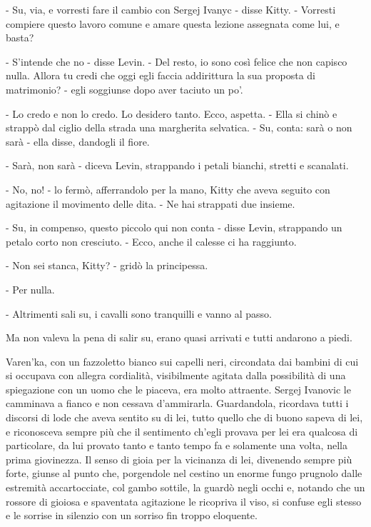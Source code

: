 - Su, via, e vorresti fare il cambio con Sergej Ivanyc - disse Kitty. - Vorresti compiere questo lavoro comune e amare questa lezione assegnata come lui, e basta? 

- S'intende che no - disse Levin. - Del resto, io sono così felice che non capisco nulla. Allora tu credi che oggi egli faccia addirittura la sua proposta di matrimonio? - egli soggiunse dopo aver taciuto un po'. 

- Lo credo e non lo credo. Lo desidero tanto. Ecco, aspetta. - Ella si chinò e strappò dal ciglio della strada una margherita selvatica. - Su, conta: sarà o non sarà - ella disse, dandogli il fiore. 

- Sarà, non sarà - diceva Levin, strappando i petali bianchi, stretti e scanalati. 

- No, no! - lo fermò, afferrandolo per la mano, Kitty che aveva seguito con agitazione il movimento delle dita. - Ne hai strappati due insieme. 

- Su, in compenso, questo piccolo qui non conta - disse Levin, strappando un petalo corto non cresciuto. - Ecco, anche il calesse ci ha raggiunto. 

- Non sei stanca, Kitty? - gridò la principessa. 

- Per nulla. 

- Altrimenti sali su, i cavalli sono tranquilli e vanno al passo. 

Ma non valeva la pena di salir su, erano quasi arrivati e tutti andarono a piedi. 

Varen'ka, con un fazzoletto bianco sui capelli neri, circondata dai bambini di cui si occupava con allegra cordialità, visibilmente agitata dalla possibilità di una spiegazione con un uomo che le piaceva, era molto attraente. Sergej Ivanovic le camminava a fianco e non cessava d'ammirarla. Guardandola, ricordava tutti i discorsi di lode che aveva sentito su di lei, tutto quello che di buono sapeva di lei, e riconosceva sempre più che il sentimento ch'egli provava per lei era qualcosa di particolare, da lui provato tanto e tanto tempo fa e solamente una volta, nella prima giovinezza. Il senso di gioia per la vicinanza di lei, divenendo sempre più forte, giunse al punto che, porgendole nel cestino un enorme fungo prugnolo dalle estremità accartocciate, col gambo sottile, la guardò negli occhi e, notando che un rossore di gioiosa e spaventata agitazione le ricopriva il viso, si confuse egli stesso e le sorrise in silenzio con un sorriso fin troppo eloquente. 

